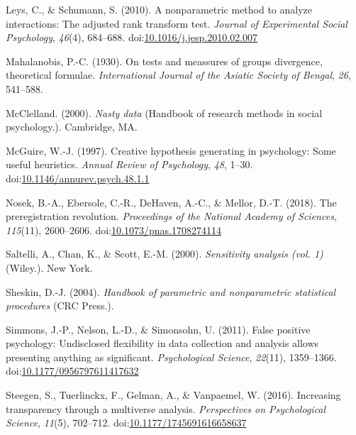 \documentclass[man,floatsintext]{apa6}
\begin{document}
\leavevmode\hypertarget{ref-Leys_and_Schumann_2010}{}%
Leys, C., \& Schumann, S. (2010). A nonparametric method to analyze interactions: The adjusted rank transform test. \emph{Journal of Experimental Social Psychology}, \emph{46}(4), 684--688. doi:\href{https://doi.org/10.1016/j.jesp.2010.02.007}{10.1016/j.jesp.2010.02.007}

\leavevmode\hypertarget{ref-Mahalanobis_1930}{}%
Mahalanobis, P.-C. (1930). On tests and meassures of groups divergence, theoretical formulae. \emph{International Journal of the Asiatic Society of Bengal}, \emph{26}, 541--588.

\leavevmode\hypertarget{ref-McClelland_2000}{}%
McClelland. (2000). \emph{Nasty data} (Handbook of research methods in social psychology.). Cambridge, MA.

\leavevmode\hypertarget{ref-McGuire_1997}{}%
McGuire, W.-J. (1997). Creative hypothesis generating in psychology: Some useful heuristics. \emph{Annual Review of Psychology}, \emph{48}, 1--30. doi:\href{https://doi.org/10.1146/annurev.psych.48.1.1}{10.1146/annurev.psych.48.1.1}

\leavevmode\hypertarget{ref-Nosek_et_al_2018}{}%
Nosek, B.-A., Ebersole, C.-R., DeHaven, A.-C., \& Mellor, D.-T. (2018). The preregistration revolution. \emph{Proceedings of the National Academy of Sciences}, \emph{115}(11), 2600--2606. doi:\href{https://doi.org/10.1073/pnas.1708274114}{10.1073/pnas.1708274114}

\leavevmode\hypertarget{ref-Saltelli_et_al_2000}{}%
Saltelli, A., Chan, K., \& Scott, E.-M. (2000). \emph{Sensitivity analysis (vol. 1)} (Wiley.). New York.

\leavevmode\hypertarget{ref-Sheskin_2004}{}%
Sheskin, D.-J. (2004). \emph{Handbook of parametric and nonparametric statistical procedures} (CRC Press.).

\leavevmode\hypertarget{ref-Simmons_et_al_2011}{}%
Simmons, J.-P., Nelson, L.-D., \& Simonsohn, U. (2011). False positive psychology: Undisclosed flexibility in data collection and analysis allows presenting anything as significant. \emph{Psychological Science}, \emph{22}(11), 1359--1366. doi:\href{https://doi.org/10.1177/0956797611417632}{10.1177/0956797611417632}

\leavevmode\hypertarget{ref-Steegen_et_al_2016}{}%
Steegen, S., Tuerlinckx, F., Gelman, A., \& Vanpaemel, W. (2016). Increasing transparency through a multiverse analysis. \emph{Perspectives on Psychological Science}, \emph{11}(5), 702--712. doi:\href{https://doi.org/10.1177/1745691616658637}{10.1177/1745691616658637}
\end{document}
